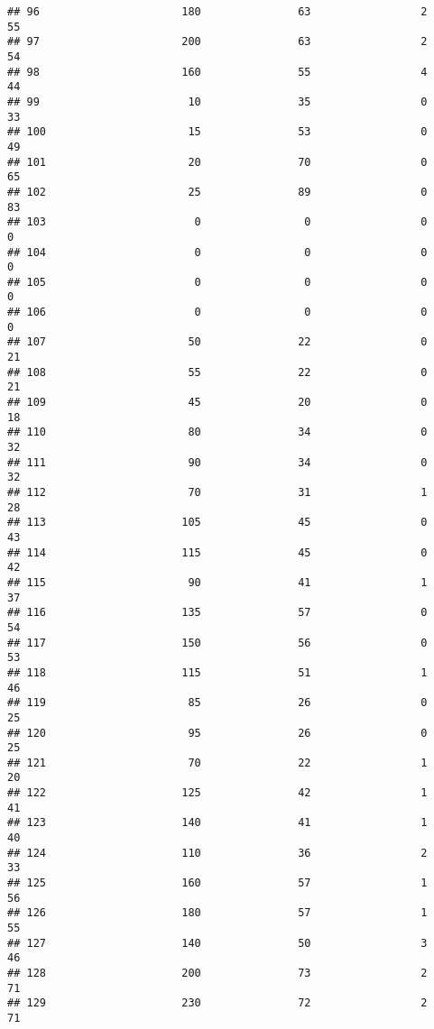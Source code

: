 \documentclass[
]{article}
\begin{document}
\begin{verbatim}
## 96                      180               63                 2         55
## 97                      200               63                 2         54
## 98                      160               55                 4         44
## 99                       10               35                 0         33
## 100                      15               53                 0         49
## 101                      20               70                 0         65
## 102                      25               89                 0         83
## 103                       0                0                 0          0
## 104                       0                0                 0          0
## 105                       0                0                 0          0
## 106                       0                0                 0          0
## 107                      50               22                 0         21
## 108                      55               22                 0         21
## 109                      45               20                 0         18
## 110                      80               34                 0         32
## 111                      90               34                 0         32
## 112                      70               31                 1         28
## 113                     105               45                 0         43
## 114                     115               45                 0         42
## 115                      90               41                 1         37
## 116                     135               57                 0         54
## 117                     150               56                 0         53
## 118                     115               51                 1         46
## 119                      85               26                 0         25
## 120                      95               26                 0         25
## 121                      70               22                 1         20
## 122                     125               42                 1         41
## 123                     140               41                 1         40
## 124                     110               36                 2         33
## 125                     160               57                 1         56
## 126                     180               57                 1         55
## 127                     140               50                 3         46
## 128                     200               73                 2         71
## 129                     230               72                 2         71

\end{verbatim}
\end{document}
